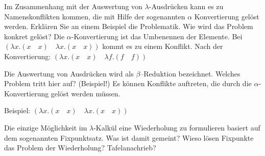 \begin{card}
	Im Zusammenhang mit der Auswertung von $\lambda$-Ausdrücken kann es zu Namenskonflikten	kommen, die mit Hilfe der sogenannten
	$\alpha$
	Konvertierung gelöst werden. Erklären Sie an einem Beispiel die Problematik. Wie wird das Problem konkret gelöst?
	\hr
  Die $\alpha$-Konvertierung ist das Umbenennen der Elemente. Bei $(\lambda x.(x \quad x) \quad \lambda x.(x \quad x))$ kommt es zu einem Konflikt. Nach
  der Konvertierung: $(\lambda x.(x \quad x) \quad \lambda f.(f \quad f))$
\end{card}

\begin{card}
	Die Auswertung von Ausdrücken wird als $\beta$–Reduktion bezeichnet. Welches Problem tritt hier auf? (Beispiel!)
	\hr
	Es können Konflikte auftreten, die durch die $\alpha$-Konvertierung gelöst werden müssen.

	Beispiel: $(\lambda x.(x \quad x) \quad \lambda x.(x \quad x))$
\end{card}

\begin{card}
	Die einzige Möglichkeit im $\lambda$-Kalkül eine Wiederholung zu formulieren basiert auf dem sogenannten Fixpunktsatz. Was ist damit gemeint? Wieso lösen Fixpunkte das Problem der Wiederholung? 
	\hr
	Tafelanachrieb?
\end{card}

